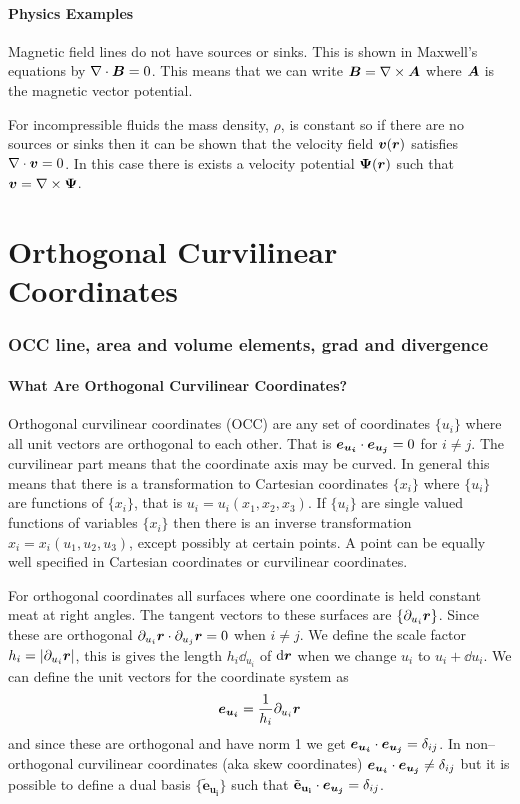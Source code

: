 \documentclass{article}
\begin{document}
    \subsection{Physics Examples}
    Magnetic field lines do not have sources or sinks.
    This is shown in Maxwell's equations by \(\nabla\cdot\bm{B} = 0\).
    This means that we can write \(\bm{B} = \nabla\times\bm{A}\) where \(\bm{A}\) is the magnetic vector potential.
    
    For incompressible fluids the mass density, \(\rho\), is constant so if there are no sources or sinks then it can be shown that the velocity field \(\bm{v}(\bm{r})\) satisfies \(\nabla\cdot\bm{v} = 0\).
    In this case there is exists a velocity potential \(\bm{\Psi}(\bm{r})\) such that \(\bm{v} = \nabla\times\bm{\Psi}\).
    
    \part{Orthogonal Curvilinear Coordinates}
    \section{OCC line, area and volume elements, grad and divergence}
    \subsection{What Are Orthogonal Curvilinear Coordinates?}
    Orthogonal curvilinear coordinates (OCC) are any set of coordinates \(\{u_i\}\) where all unit vectors are orthogonal to each other.
    That is \(\bm{e_{u_i}}\cdot\bm{e_{u_j}} = 0\) for \(i\ne j\).
    The curvilinear part means that the coordinate axis may be curved.
    In general this means that there is a transformation to Cartesian coordinates \(\{x_i\}\) where \(\{u_i\}\) are functions of \(\{x_i\}\), that is \(u_i = u_i(x_1, x_2, x_3)\).
    If \(\{u_i\}\) are single valued functions of variables \(\{x_i\}\) then there is an inverse transformation \(x_i = x_i(u_1, u_2, u_3)\), except possibly at certain points.
    A point can be equally well specified in Cartesian coordinates or curvilinear coordinates.
    
    For orthogonal coordinates all surfaces where one coordinate is held constant meat at right angles.
    The tangent vectors to these surfaces are \(\{\partial_{u_i}\bm{r}\}\).
    Since these are orthogonal \(\partial_{u_i}\bm{r}\cdot\partial_{u_j}\bm{r} = 0\) when \(i\ne j\).
    We define the scale factor \(h_i = |\partial_{u_i}\bm{r}|\), this is gives the length \(h_i\dd_{u_i}\) of \(\dd\bm{r}\) when we change \(u_i\) to \(u_i + \dd u_i\). We can define the unit vectors for the coordinate system as
    \[\bm{e_{u_i}} = \frac{1}{h_i}\partial_{u_i}\bm{r}\]
    and since these are orthogonal and have norm 1 we get \(\bm{e_{u_i}}\cdot\bm{e_{u_j}} = \delta_{ij}\).
    In non--orthogonal curvilinear coordinates (aka skew coordinates) \(\bm{e_{u_i}}\cdot\bm{e_{u_j}}\ne\delta_{ij}\) but it is possible to define a dual basis \(\{\tilde{\mathbf{e}}_{\mathbf{u_i}}\}\) such that \(\tilde{\mathbf{e}}_{\mathbf{u_i}}\cdot\bm{e_{u_j}} = \delta_{ij}\).
    
\end{document}
